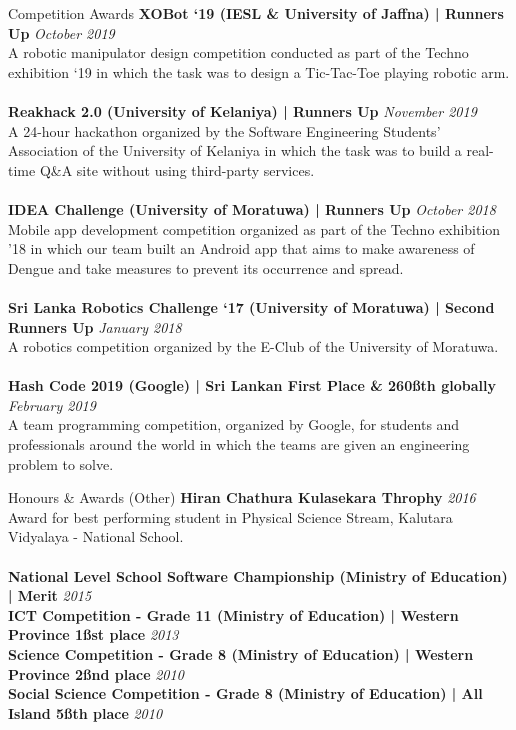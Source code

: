 \documentclass{cv}
\begin{document}
\begin{rSection}{Competition Awards}
{{\bf XOBot `19 (IESL \& University of Jaffna) | Runners Up}                     \hfill {\em October 2019} 
\\A robotic manipulator design competition conducted as part of the Techno exhibition `19 in which the task was to design a Tic-Tac-Toe playing robotic arm.\\ \\
{\bf Reakhack 2.0 (University of Kelaniya) | Runners Up}                        \hfill {\em November 2019} 
\\A 24-hour hackathon organized by the Software Engineering Students’ Association of the University of Kelaniya in which the task was to build a real-time Q\&A site without using third-party services.\\ \\
{\bf IDEA Challenge (University of Moratuwa) | Runners Up}                      \hfill {\em October 2018} 
\\Mobile app development competition organized as part of the Techno exhibition '18 in which our team built an Android app that aims to make awareness of Dengue and take measures to prevent its occurrence and spread.\\ \\
{\bf Sri Lanka Robotics Challenge `17 (University of Moratuwa) | Second Runners Up} \hfill {\em January 2018} 
\\A robotics competition organized by the E-Club of the University of Moratuwa.\\ \\
{\bf Hash Code 2019 (Google) | Sri Lankan First Place \& 260\ss{th} globally}   \hfill {\em February 2019} 
\\A team programming competition, organized by Google, for students and professionals around the world in which the teams are given an engineering problem to solve.
}\end{rSection}


\begin{rSection}{Honours \& Awards (Other)}
{\bf Hiran Chathura Kulasekara Throphy}                                                         \hfill {\em 2016} 
\\Award for best performing student in Physical Science Stream, Kalutara Vidyalaya - National School.\\ \\
{\bf National Level School Software Championship (Ministry of Education) | Merit}               \hfill {\em 2015}\\ 
{\bf ICT Competition - Grade 11 (Ministry of Education) | Western Province 1\ss{st} place}      \hfill {\em 2013}\\ 
{\bf Science Competition - Grade 8 (Ministry of Education) | Western Province 2\ss{nd} place}   \hfill {\em 2010}\\ 
{\bf Social Science Competition - Grade 8 (Ministry of Education) | All Island 5\ss{th} place}  \hfill {\em 2010} 
\end{rSection}
\end{document}

